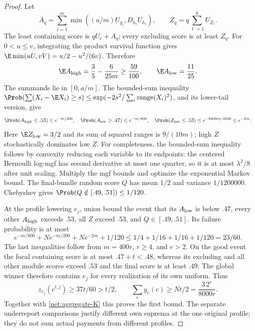 \begin{proof}
Let
\[
 A_q=\sum_{i=1}^m\min((a/m)U_{y_i},D_{h_i}U_{h_i}),
 \qquad Z_q=q\sum_{\ell=1}^kU_{Z_\ell}.
\]
The least containing score is $qU_e+A_q$; every excluding score is at least
$Z_q$.  For $0<u\le v$, integrating the product survival function gives
$\E\min(uU,vV)=u/2-u^2/(6v)$.  Therefore
\[
 \E A_{\rm high}=\frac35-\frac6{25m}\ge\frac{59}{100},
 \qquad \E A_{\rm low}=\frac{11}{25}.
\]
The summands lie in $[0,a/m]$.  The bounded-sum inequality
$\Prob(\sum(X_i-\E X_i)\ge s)\le
\exp(-2s^2/\sum_i\operatorname{range}(X_i)^2)$, and its lower-tail version,
give
\[
 \Prob(A_{\rm high}\le.53)\le e^{-m/200},\quad
 \Prob(A_{\rm low}\ge.47)\le e^{-m/800},\quad
 \Prob(Z_{\rm low}\le.53)\le e^{-9409m/4500}\le e^{-2m}.
\]
Here $\E Z_{\rm low}=3/2$ and its sum of squared ranges is $9/(10m)$;
high $Z$ stochastically dominates low $Z$.
For completeness, the bounded-sum inequality follows by convexity reducing
each variable to its endpoints: the centered Bernoulli log-mgf has second
derivative at most one quarter, so it is at most $\lambda^2/8$ after unit
scaling.  Multiply the mgf bounds and optimize the exponential Markov bound.
The final-bundle random score $Q$ has mean $1/2$ and variance $1/1200000$.
Chebyshev gives $\Prob(Q\notin[.49,.51])\le1/120$.

At the profile lowering $e_j$, union bound the event that its $A_{\rm low}$
is below $.47$, every other $A_{\rm high}$ exceeds $.53$, all $Z$ exceed
$.53$, and $Q\in[.49,.51]$.  Its failure probability is at most
\[
 e^{-m/800}+Ne^{-m/200}+Ne^{-2m}+1/120
 \le1/4+1/16+1/16+1/120=23/60.
\]
The last inequalities follow from $m=400r$, $r\ge4$, and $e>2$.
On the good event the focal containing score is at most $.47+t<.48$,
whereas its excluding and all other module scores exceed $.53$ and the
final score is at least $.49$.  The global winner therefore contains $e_j$
for every realization of its own uniform.  Thus
\[
 z_{e_j}(c^{t,j})\ge37t/60>t/2,\qquad
 \sum_ey_e(c)\ge Nt/2=\frac{3\,2^r}{8000r}.
\]
Together with \eqref{net:aggregate-K} this proves the first bound.
The separate underreport comparisons justify different own suprema at the
one original profile; they do not sum actual payments from different profiles.


\end{proof}
